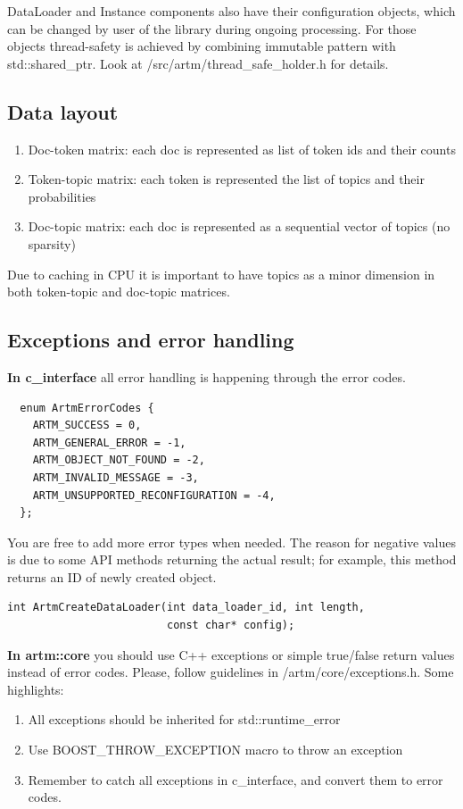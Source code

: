 \documentclass[11pt,a4paper,twoside]{report}
\begin{document}
DataLoader and Instance components also have their configuration objects,
which can be changed by user of the library during ongoing processing.
For those objects thread-safety is achieved by combining immutable pattern with std::shared\_ptr.
Look at /src/artm/thread\_safe\_holder.h for details.

\subsection{Data layout}
\begin{enumerate}
    \item Doc-token matrix: each doc is represented as list of token ids and their counts
    \item Token-topic matrix: each token is represented the list of topics and their probabilities
    \item Doc-topic matrix: each doc is represented as a sequential vector of topics (no sparsity)
\end{enumerate}

Due to caching in CPU it is important to have topics as a minor dimension in both token-topic and doc-topic matrices.

\subsection{Exceptions and error handling}

\textbf{In c\_interface} all error handling is happening through the error codes.
\begin{verbatim}
  enum ArtmErrorCodes {
    ARTM_SUCCESS = 0,
    ARTM_GENERAL_ERROR = -1,
    ARTM_OBJECT_NOT_FOUND = -2,
    ARTM_INVALID_MESSAGE = -3,
    ARTM_UNSUPPORTED_RECONFIGURATION = -4,
  };
\end{verbatim}
You are free to add more error types when needed.
The reason for negative values is due to some API methods
returning the actual result; for example, this method returns an ID of newly created object.
\begin{verbatim}
int ArtmCreateDataLoader(int data_loader_id, int length,
                         const char* config);
\end{verbatim}

\textbf{In artm::core} you should use C++ exceptions
or simple true/false return values instead of error codes.
Please, follow guidelines in /artm/core/exceptions.h.
Some highlights:
\begin{enumerate}
    \item All exceptions should be inherited for std::runtime\_error
    \item Use BOOST\_THROW\_EXCEPTION macro to throw an exception
    \item Remember to catch all exceptions in c\_interface, and convert them to error codes.
\end{enumerate}
\end{document}
